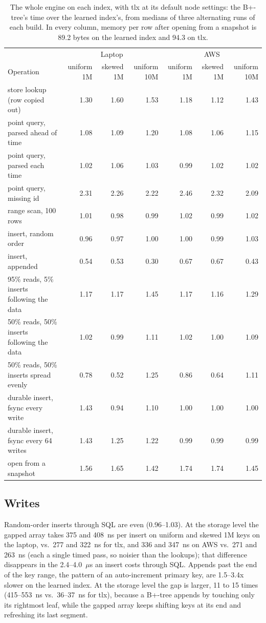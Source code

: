 \documentclass[conference]{IEEEtran}
\begin{document}
\begin{table}[t]
\caption{The whole engine on each index, with tlx at its default node settings:
the B+-tree's time over the learned index's, from medians of three alternating
runs of each build. In every column, memory per row after opening from a snapshot
is 89.2 bytes on the learned index and 94.3 on tlx.}
\label{tab:engine}
\centering
\small
\begin{tabular}{lrrrrrr}
\toprule
& \multicolumn{3}{c}{Laptop} & \multicolumn{3}{c}{AWS} \\
Operation & uniform 1M & skewed 1M & uniform 10M & uniform 1M & skewed 1M & uniform 10M \\
\midrule
store lookup (row copied out) & 1.30 & 1.60 & 1.53 & 1.18 & 1.12 & 1.43 \\
point query, parsed ahead of time & 1.08 & 1.09 & 1.20 & 1.08 & 1.06 & 1.15 \\
point query, parsed each time & 1.02 & 1.06 & 1.03 & 0.99 & 1.02 & 1.02 \\
point query, missing id & 2.31 & 2.26 & 2.22 & 2.46 & 2.32 & 2.09 \\
range scan, 100 rows & 1.01 & 0.98 & 0.99 & 1.02 & 0.99 & 1.02 \\
insert, random order & 0.96 & 0.97 & 1.00 & 1.00 & 0.99 & 1.03 \\
insert, appended & 0.54 & 0.53 & 0.30 & 0.67 & 0.67 & 0.43 \\
95\% reads, 5\% inserts following the data & 1.17 & 1.17 & 1.45 & 1.17 & 1.16 & 1.29 \\
50\% reads, 50\% inserts following the data & 1.02 & 0.99 & 1.11 & 1.02 & 1.00 & 1.09 \\
50\% reads, 50\% inserts spread evenly & 0.78 & 0.52 & 1.25 & 0.86 & 0.64 & 1.11 \\
durable insert, fsync every write & 1.43 & 0.94 & 1.10 & 1.00 & 1.00 & 1.00 \\
durable insert, fsync every 64 writes & 1.43 & 1.25 & 1.22 & 0.99 & 0.99 & 0.99 \\
open from a snapshot & 1.56 & 1.65 & 1.42 & 1.74 & 1.74 & 1.45 \\
\bottomrule
\end{tabular}
\end{table}

\subsection{Writes}

Random-order inserts through SQL are even (0.96--1.03). At the storage
level the gapped array takes 375 and 408~ns per insert on uniform and skewed
1M keys on the laptop, vs.\ 277 and 322~ns for tlx, and 336 and 347~ns on
AWS vs.\ 271 and 263~ns (each a single timed pass, so noisier than the
lookups); that difference disappears in the 2.4--4.0~$\mu$s an insert costs
through SQL. Appends past the end of the key range, the pattern of an
auto-increment primary key, are 1.5--3.4x slower on the learned index. At the
storage level the gap is larger, 11 to 15 times (415--553~ns vs.\ 36--37~ns
for tlx), because a B+-tree appends by touching only its rightmost leaf, while the gapped array keeps
shifting keys at its end and refreshing its last segment.
\end{document}
